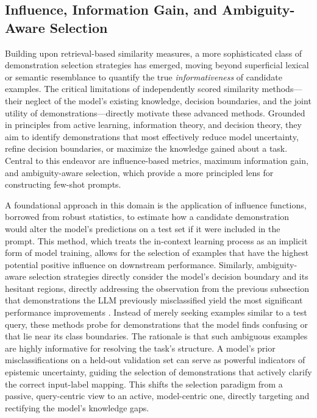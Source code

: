 \documentclass[11pt]{article}
\begin{document}
\subsection{Influence, Information Gain, and Ambiguity-Aware Selection}

Building upon retrieval-based similarity measures, a more sophisticated class of demonstration selection strategies has emerged, moving beyond superficial lexical or semantic resemblance to quantify the true \emph{informativeness} of candidate examples. The critical limitations of independently scored similarity methods---their neglect of the model's existing knowledge, decision boundaries, and the joint utility of demonstrations---directly motivate these advanced methods. Grounded in principles from active learning, information theory, and decision theory, they aim to identify demonstrations that most effectively reduce model uncertainty, refine decision boundaries, or maximize the knowledge gained about a task. Central to this endeavor are influence-based metrics, maximum information gain, and ambiguity-aware selection, which provide a more principled lens for constructing few-shot prompts.

A foundational approach in this domain is the application of influence functions, borrowed from robust statistics, to estimate how a candidate demonstration would alter the model's predictions on a test set if it were included in the prompt. This method, which treats the in-context learning process as an implicit form of model training, allows for the selection of examples that have the highest potential positive influence on downstream performance. Similarly, ambiguity-aware selection strategies directly consider the model's decision boundary and its hesitant regions, directly addressing the observation from the previous subsection that demonstrations the LLM previously misclassified yield the most significant performance improvements \cite{ref36}. Instead of merely seeking examples similar to a test query, these methods probe for demonstrations that the model finds confusing or that lie near its class boundaries. The rationale is that such ambiguous examples are highly informative for resolving the task's structure. A model's prior misclassifications on a held-out validation set can serve as powerful indicators of epistemic uncertainty, guiding the selection of demonstrations that actively clarify the correct input-label mapping. This shifts the selection paradigm from a passive, query-centric view to an active, model-centric one, directly targeting and rectifying the model's knowledge gaps.
\end{document}
